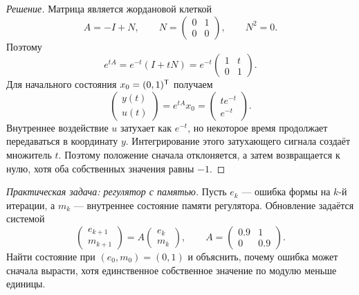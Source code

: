 \begin{proof}[Решение]
Матрица является жордановой клеткой
\[
A=-I+N,
\qquad
N=
\begin{pmatrix}
0&1\\
0&0
\end{pmatrix},
\qquad
N^2=0.
\]
Поэтому
\[
e^{tA}=e^{-t}(I+tN)
=e^{-t}
\begin{pmatrix}
1&t\\
0&1
\end{pmatrix}.
\]
Для начального состояния $x_0=(0,1)^{\mathsf{T}}$ получаем
\[
\begin{pmatrix}y(t)\\u(t)\end{pmatrix}
=
e^{tA}x_0
=
\begin{pmatrix}
t e^{-t}\\e^{-t}
\end{pmatrix}.
\]
Внутреннее воздействие $u$ затухает как $e^{-t}$, но некоторое время продолжает передаваться в координату $y$. Интегрирование этого затухающего сигнала создаёт множитель $t$. Поэтому положение сначала отклоняется, а затем возвращается к нулю, хотя оба собственных значения равны $-1$.
\end{proof}

\begin{problem}
\textit{Практическая задача: регулятор с памятью.}
Пусть $e_k$ --- ошибка формы на $k$-й итерации, а $m_k$ --- внутреннее состояние памяти регулятора. Обновление задаётся системой
\[
\begin{pmatrix}e_{k+1}\\m_{k+1}\end{pmatrix}
=
A
\begin{pmatrix}e_k\\m_k\end{pmatrix},
\qquad
A=
\begin{pmatrix}
0.9&1\\
0&0.9
\end{pmatrix}.
\]
Найти состояние при $(e_0,m_0)=(0,1)$ и объяснить, почему ошибка может сначала вырасти, хотя единственное собственное значение по модулю меньше единицы.
\end{problem}

